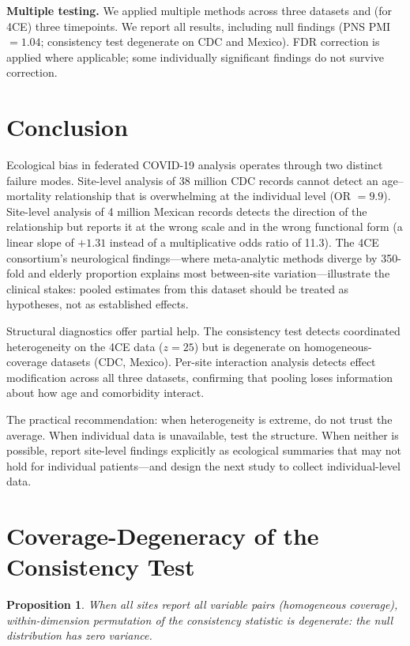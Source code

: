 \documentclass{article}
\newtheorem{proposition}{Proposition}
\begin{document}
\textbf{Multiple testing.}  We applied multiple methods across three
datasets and (for 4CE) three timepoints.  We report all results, including
null findings (PNS PMI $= 1.04$; consistency test degenerate on CDC and
Mexico).  FDR correction is applied where applicable; some individually
significant findings do not survive correction.


\section{Conclusion}

Ecological bias in federated COVID-19 analysis operates through two distinct
failure modes.  Site-level analysis of 38 million CDC records cannot detect an
age--mortality relationship that is overwhelming at the individual level (OR
$= 9.9$).  Site-level analysis of 4 million Mexican records detects the
direction of the relationship but reports it at the wrong scale and in the
wrong functional form (a linear slope of $+1.31$ instead of a multiplicative
odds ratio of 11.3).  The 4CE consortium's neurological findings---where
meta-analytic methods diverge by 350-fold and elderly proportion explains most
between-site variation---illustrate the clinical stakes: pooled estimates from
this dataset should be treated as hypotheses, not as established effects.

Structural diagnostics offer partial help.  The consistency test detects
coordinated heterogeneity on the 4CE data ($z = 25$) but is degenerate on
homogeneous-coverage datasets (CDC, Mexico).  Per-site interaction analysis
detects effect modification across all three datasets, confirming that
pooling loses information about how age and comorbidity interact.

The practical recommendation: when heterogeneity is extreme, do not trust the
average.  When individual data is unavailable, test the structure.  When
neither is possible, report site-level findings explicitly as ecological
summaries that may not hold for individual patients---and design the next
study to collect individual-level data.


\appendix

\section{Coverage-Degeneracy of the Consistency Test}
\label{app:degeneracy}

\begin{proposition}
When all sites report all variable pairs (homogeneous coverage), within-dimension permutation of the consistency statistic is degenerate: the null distribution has zero variance.
\end{proposition}
\end{document}
